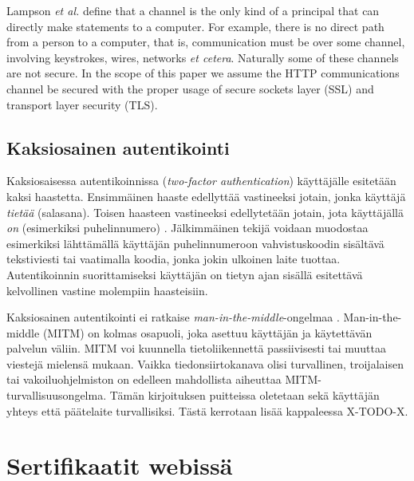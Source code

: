 \documentclass[english,gradu]{tktltiki}
\begin{document}
          Lampson \emph{et al.} \cite{lampson_distributed_1992} define that a channel is the only kind of a principal that can directly make statements to a computer. For example, there is no direct path from a person to a computer, that is, communication must be over some channel,
involving keystrokes, wires, networks \emph{et cetera}. Naturally some of these channels are not secure. In the scope of this paper we assume
the HTTP communications channel be secured with the proper usage of secure sockets layer (SSL) and transport layer security (TLS).





\subsection{Kaksiosainen autentikointi} %
\label{sub:kaksiosainen_autentikointi}

Kaksiosaisessa autentikoinnissa (\emph{two-factor authentication}) käyttäjälle esitetään kaksi haastetta. Ensimmäinen haaste edellyttää vastineeksi jotain, jonka käyttäjä \emph{tietää} (salasana). Toisen haasteen vastineeksi edellytetään jotain, jota käyttäjällä \emph{on} (esimerkiksi puhelinnumero) \cite{NIST_SP800-63, google_2step_2010}. Jälkimmäinen tekijä voidaan muodostaa esimerkiksi lähttämällä käyttäjän puhelinnumeroon vahvistuskoodin sisältävä tekstiviesti tai vaatimalla koodia, jonka jokin ulkoinen laite tuottaa. Autentikoinnin suorittamiseksi käyttäjän on tietyn ajan sisällä esitettävä kelvollinen vastine molempiin haasteisiin.

Kaksiosainen autentikointi ei ratkaise \emph{man-in-the-middle}-ongelmaa \cite{schneier_2factor_2005}.
Man-in-the-middle (MITM) on kolmas osapuoli, joka asettuu käyttäjän ja käytettävän palvelun väliin. MITM voi kuunnella tietoliikennettä passiivisesti tai muuttaa viestejä mielensä mukaan. Vaikka tiedonsiirtokanava olisi turvallinen, troijalaisen tai vakoiluohjelmiston on edelleen mahdollista aiheuttaa MITM-turvallisuusongelma. Tämän kirjoituksen puitteissa oletetaan sekä käyttäjän yhteys että päätelaite turvallisiksi. Tästä kerrotaan lisää kappaleessa X-TODO-X.



\section{Sertifikaatit webissä} %
\label{sec:sertifikaatit_webissä}
\end{document}
